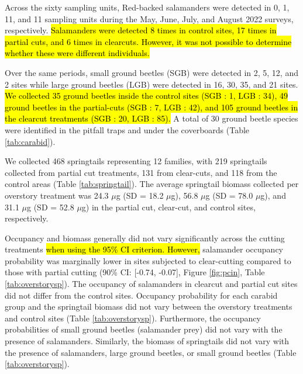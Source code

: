 \vspace{10pt}

Across the sixty sampling units, Red-backed salamanders were detected in 0, 1, 11, and 11 sampling units during the May, June, July, and August 2022 surveys, respectively. 
\hl{Salamanders were detected 8 times in control sites, 17 times in partial cuts, and 6 times in clearcuts. 
However, it was not possible to determine whether these were different individuals. }

Over the same periods, small ground beetles (SGB) were detected in 2, 5, 12, and 2 sites while large ground beetles (LGB) were detected in 16, 30, 35, and 21 sites. 
\hl{We collected 35 ground beetles inside the control sites (SGB : 1, LGB : 34), 49 ground beetles in the partial-cuts (SGB : 7, LGB : 42), and 105 ground beetles in the clearcut treatments (SGB : 20, LGB : 85). }
A total of 30 ground beetle species were identified in the pitfall traps and under the coverboards (Table \ref{tab:carabid}). 

We collected 468 springtails representing 12 families, with 219 springtails collected from partial cut treatments, 131 from clear-cuts, and 118 from the control areas (Table \ref{tab:springtail}). 
The average springtail biomass collected per overstory treatment was 24.3 $\mu$g (SD = 18.2 $\mu$g), 56.8 $\mu$g (SD = 78.0 $\mu$g), and 31.1 $\mu$g (SD = 52.8 $\mu$g) in the partial cut, clear-cut, and control sites, respectively. 

Occupancy and biomass generally did not vary significantly across the cutting treatments \hl{when using the 95\% CI criterion. 
However,} salamander occupancy probability was marginally lower in sites subjected to clear-cutting compared to those with partial cutting (90\% CI: [-0.74, -0.07], Figure \ref{fig:pcin}, Table \ref{tab:overstorysp}). 
The occupancy of salamanders in clearcut and partial cut sites did not differ from the control sites. 
Occupancy probability for each carabid group and the springtail biomass did not vary between the overstory treatments and control sites (Table \ref{tab:overstorysp}). 
Furthermore, the occupancy probabilities of small ground beetles (salamander prey) did not vary with the presence of salamanders. 
Similarly, the biomass of springtails did not vary with the presence of salamanders, large ground beetles, or small ground beetles (Table \ref{tab:overstorysp}).

